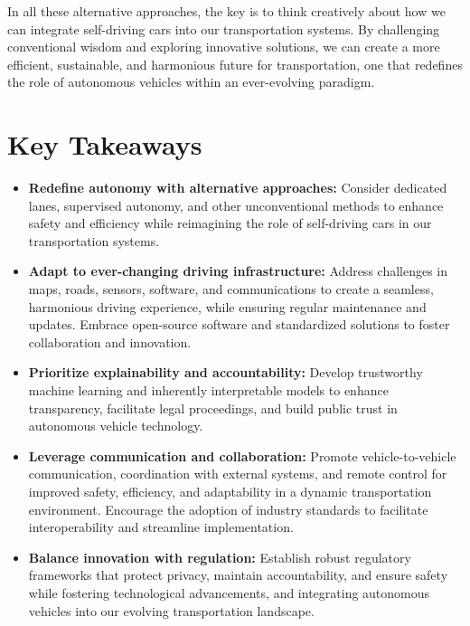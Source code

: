 In all these alternative approaches, the key is to think creatively about how we can integrate self-driving cars into our transportation systems. By challenging conventional wisdom and exploring innovative solutions, we can create a more efficient, sustainable, and harmonious future for transportation, one that redefines the role of autonomous vehicles within an ever-evolving paradigm.

\section{Key Takeaways}

\begin{itemize}
\item \textbf{Redefine autonomy with alternative approaches:} Consider dedicated lanes, supervised autonomy, and other unconventional methods to enhance safety and efficiency while reimagining the role of self-driving cars in our transportation systems.
\item \textbf{Adapt to ever-changing driving infrastructure:} Address challenges in maps, roads, sensors, software, and communications to create a seamless, harmonious driving experience, while ensuring regular maintenance and updates. Embrace open-source software and standardized solutions to foster collaboration and innovation.
\item \textbf{Prioritize explainability and accountability:} Develop trustworthy machine learning and inherently interpretable models to enhance transparency, facilitate legal proceedings, and build public trust in autonomous vehicle technology.
\item \textbf{Leverage communication and collaboration:} Promote vehicle-to-vehicle communication, coordination with external systems, and remote control for improved safety, efficiency, and adaptability in a dynamic transportation environment. Encourage the adoption of industry standards to facilitate interoperability and streamline implementation.
\item \textbf{Balance innovation with regulation:} Establish robust regulatory frameworks that protect privacy, maintain accountability, and ensure safety while fostering technological advancements, and integrating autonomous vehicles into our evolving transportation landscape.
\end{itemize}
